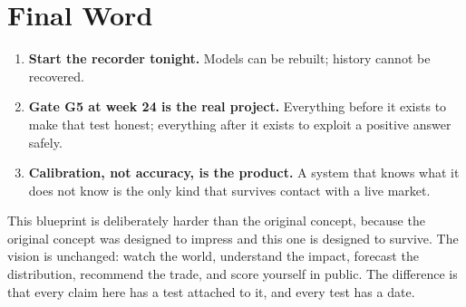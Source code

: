 \chapter{Final Word}

\begin{keybox}[title={The three sentences that matter}]
\begin{enumerate}
\item \textbf{Start the recorder tonight.} Models can be rebuilt; history cannot
be recovered.
\item \textbf{Gate G5 at week 24 is the real project.} Everything before it
exists to make that test honest; everything after it exists to exploit a
positive answer safely.
\item \textbf{Calibration, not accuracy, is the product.} A system that knows
what it does not know is the only kind that survives contact with a live market.
\end{enumerate}
\end{keybox}

\vspace{8pt}
This blueprint is deliberately harder than the original concept, because the
original concept was designed to impress and this one is designed to survive.
The vision is unchanged: watch the world, understand the impact, forecast the
distribution, recommend the trade, and score yourself in public. The difference
is that every claim here has a test attached to it, and every test has a date.
